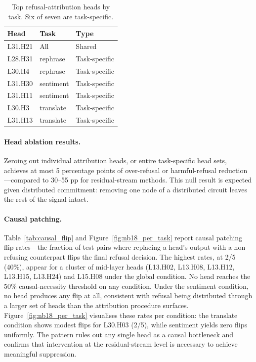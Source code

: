 \documentclass[11pt]{article}
\begin{document}
\begin{table}[h]
\centering
\small
\begin{tabular}{lll}
\toprule
Head    & Task      & Type \\
\midrule
L31.H21 & All       & Shared \\
L28.H31 & rephrase  & Task-specific \\
L30.H4  & rephrase  & Task-specific \\
L31.H30 & sentiment & Task-specific \\
L31.H11 & sentiment & Task-specific \\
L30.H3  & translate & Task-specific \\
L31.H13 & translate & Task-specific \\
\bottomrule
\end{tabular}
\caption{Top refusal-attribution heads by task. Six of seven are task-specific.}
\label{tab:heads}
\end{table}

\paragraph{Head ablation results.}
Zeroing out individual attribution heads, or entire task-specific head sets,
achieves at most 5 percentage points of over-refusal or harmful-refusal
reduction---compared to 30--55 pp for residual-stream methods.
This null result is expected given distributed commitment: removing one node
of a distributed circuit leaves the rest of the signal intact.

\paragraph{Causal patching.}
Table~\ref{tab:causal_flip} and Figure~\ref{fig:nb18_per_task} report causal
patching flip rates---the fraction of test pairs where replacing a head's
output with a non-refusing counterpart flips the final refusal decision.
The highest rates, at 2/5 (40\%), appear for a cluster of mid-layer heads
(L13.H02, L13.H08, L13.H12, L13.H15, L13.H24) and L15.H08 under the global
condition.
No head reaches the 50\% causal-necessity threshold on any condition.
Under the sentiment condition, no head produces any flip at all, consistent
with refusal being distributed through a larger set of heads than the
attribution procedure surfaces.
Figure~\ref{fig:nb18_per_task} visualises these rates per condition: the
translate condition shows modest flips for L30.H03 (2/5), while sentiment
yields zero flips uniformly.
The pattern rules out any single head as a causal bottleneck and confirms
that intervention at the residual-stream level is necessary to achieve
meaningful suppression.
\end{document}
